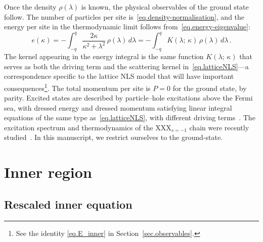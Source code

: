 \documentclass[11pt,a4paper]{article}
\newcommand{\kap}{\kappa}
\theoremstyle{definition}
\begin{document}
Once the density $\rho(\lambda)$ is known, the physical observables of the
ground state follow.  The number of particles per site
is~\eqref{eq.density-normalisation}, and the energy per site in the
thermodynamic limit follows from~\eqref{eq.energy-eigenvalue}:
\begin{equation}\label{eq.energy-per-site}
  e(\kap) = -\int_{-q}^{q}\frac{2\kappa}{\kappa^2 + \lambda^2}\,
  \rho(\lambda)\,d\lambda
  = -\int_{-q}^{q}K(\lambda;\,\kappa)\,\rho(\lambda)\,d\lambda\,.
\end{equation}
The kernel appearing in the energy integral is the same function
$K(\lambda;\,\kappa)$ that serves as both the driving term and the
scattering kernel in~\eqref{eq.latticeNLS}---a correspondence
specific to the lattice NLS model that will have important
consequences\footnote{See the identity
\eqref{eq.E_inner} in
Section~\ref{sec.observables}.}.
The total momentum per site is $P = 0$ for the ground state, by parity.
Excited states are described by particle--hole excitations above the
Fermi sea, with dressed energy and dressed momentum satisfying linear integral equations of the same
type as~\eqref{eq.latticeNLS}, with different driving
terms~\cite{KorepinBogoliubovIzergin1993, YangYang1969}.  The excitation spectrum and thermodynamics of
the XXX$_{s=-1}$ chain were recently studied~\cite{ZhongEtAl2025}. In this manuscript, we restrict ourselves to the ground-state. 



\section{Inner region}
\label{sec.inner}
\subsection{Rescaled inner equation}
\label{sec.rescaling}
\end{document}

